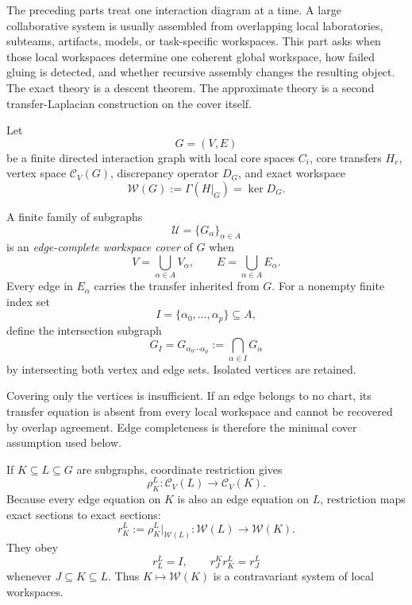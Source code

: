 
The preceding parts treat one interaction diagram at a time. A large
collaborative system is usually assembled from overlapping local laboratories,
subteams, artifacts, models, or task-specific workspaces. This part asks when
those local workspaces determine one coherent global workspace, how failed
gluing is detected, and whether recursive assembly changes the resulting
object. The exact theory is a descent theorem. The approximate theory is a
second transfer-Laplacian construction on the cover itself.



Let
\[
G=(V,E)
\]
be a finite directed interaction graph with local core spaces \(C_i\), core
transfers \(H_e\), vertex space \(\mathcal C_V(G)\), discrepancy operator
\(D_G\), and exact workspace
\[
\mathscr W(G)
:=
\Gamma(H|_G)
=
\ker D_G.
\]

\begin{definition}\label{def:workspace-cover}
A finite family of subgraphs
\[
\mathcal U=\{G_\alpha\}_{\alpha\in A}
\]
is an \emph{edge-complete workspace cover} of \(G\) when
\[
V=\bigcup_{\alpha\in A}V_\alpha,
\qquad
E=\bigcup_{\alpha\in A}E_\alpha.
\]
Every edge in \(E_\alpha\) carries the transfer inherited from \(G\). For a
nonempty finite index set
\[
I=\{\alpha_0,\ldots,\alpha_p\}\subseteq A,
\]
define the intersection subgraph
\[
G_I
=
G_{\alpha_0\cdots\alpha_p}
:=
\bigcap_{\alpha\in I}G_\alpha
\]
by intersecting both vertex and edge sets. Isolated vertices are retained.
\end{definition}

Covering only the vertices is insufficient. If an edge belongs to no chart,
its transfer equation is absent from every local workspace and cannot be
recovered by overlap agreement. Edge completeness is therefore the minimal
cover assumption used below.

If \(K\subseteq L\subseteq G\) are subgraphs, coordinate restriction gives
\[
\rho_K^L:\mathcal C_V(L)\longrightarrow\mathcal C_V(K).
\]
Because every edge equation on \(K\) is also an edge equation on \(L\),
restriction maps exact sections to exact sections:
\[
r_K^L
:=
\rho_K^L|_{\mathscr W(L)}:
\mathscr W(L)\longrightarrow\mathscr W(K).
\]
They obey
\[
r_L^L=I,
\qquad
r_J^K r_K^L=r_J^L
\]
whenever \(J\subseteq K\subseteq L\). Thus \(K\mapsto\mathscr W(K)\) is a
contravariant system of local workspaces.

